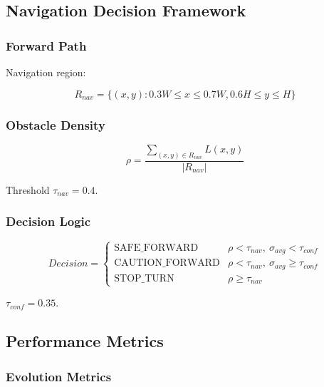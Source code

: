 \documentclass[12pt,oneside]{book}
\begin{document}
\subsection{Navigation Decision Framework}

\subsubsection{Forward Path}

Navigation region:

\begin{equation}
R_{nav} = \{(x,y): 0.3W \leq x \leq 0.7W, 0.6H \leq y \leq H\}
\label{eq:navigation_region_detailed}
\end{equation}

\subsubsection{Obstacle Density}

\begin{equation}
\rho = \frac{\sum_{(x,y) \in R_{nav}} L(x,y)}{|R_{nav}|}
\label{eq:obstacle_density_detailed}
\end{equation}

Threshold $\tau_{nav}=0.4$.

\subsubsection{Decision Logic}

\begin{equation}
Decision =
\begin{cases}
\text{SAFE\_FORWARD} & \rho < \tau_{nav}, \ \sigma_{avg} < \tau_{conf} \\
\text{CAUTION\_FORWARD} & \rho < \tau_{nav}, \ \sigma_{avg} \geq \tau_{conf} \\
\text{STOP\_TURN} & \rho \geq \tau_{nav}
\end{cases}
\label{eq:navigation_decision_detailed}
\end{equation}

$\tau_{conf}=0.35$.

\subsection{Performance Metrics}

\subsubsection{Evolution Metrics}
\end{document}
